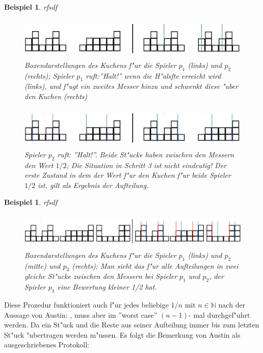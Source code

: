 \documentclass[11pt, a4paper, twoside]{article}
\newcommand{\wf}{\color{white}}
\newtheorem{bsp}[satz]{Beispiel}
\numberwithin{equation}{section}
\begin{document}
\begin{bsp}\wf rfsdf
\begin{figure}[h!]
\includegraphics[height=2cm]{cc4.jpg}
\caption[Beispiel zum Austins Moving-Knife-Protokoll 1/2]{Boxendarstellungen des Kuchens f"ur die Spieler $p_1$ (links) und $p_2$ (rechts); Spieler $p_1$ ruft:''Halt!'' wenn die H"alsfte erreicht wird (links), und f"ugt ein zweites Messer hinzu und schwenkt diese "uber den Kuchen (rechts)}
\end{figure}
\begin{figure}[h!]
\includegraphics[height=2cm]{cc5.jpg}
\caption[Beispiel zum Austins Moving-Knife-Protokoll 2/2]{Spieler $p_2$ ruft: ''Halt!''. Beide St"ucke haben zwischen den Messern den Wert $1/2$; Die Situation in Schritt 3 ist nicht eindeutig! Der erste Zustand in dem der Wert f"ur den Kuchen f"ur beide Spieler $1/2$ ist, gilt als Ergebnis der Aufteilung.}
\end{figure}
\end{bsp}
\begin{bsp}\wf rfsdf
\begin{figure}[h!]
\includegraphics[height=1.73cm]{cc8.jpg}
\caption[Beispiel zum Austins Moving-Knife-Protokoll f"ur 3 Spieler]{Boxendarstellungen des Kuchens f"ur die Spieler $p_1$ (links) und $p_2$ (mitte) und $p_3$ (rechts); Man sieht das f"ur alle Aufteilungen in zwei gleiche St"ucke zwischen den Messern bei Spieler $p_1$ und $p_2$, der Spieler $p_3$ eine Bewertung kleiner 1/2 hat.}
\end{figure}
\end{bsp}  
Diese Prozedur funktioniert auch f"ur jedes beliebige $1/n$ mit $n \in \mathbb{N}$ nach der Aussage von Austin: \cite{15}, muss aber im ''worst case'' $(n-1)$- mal durchgef"uhrt werden. Da ein St"uck und die Reste aus seiner Aufteilung immer bis zum letzten St"uck "ubertragen werden m"ussen. Es folgt die Bemerkung von Austin als ausgeschriebenes Protokoll:\\
\end{document}
